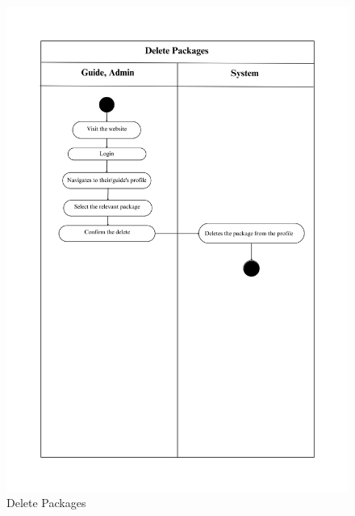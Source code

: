 \begin{figure}[h]
    \centering
    \includegraphics[width=1\textwidth]{Images/Activity Diagrams/16 Delete Packages.png}
    \caption{Delete Packages}
    \label{fig:activity-delete-packages}
\end{figure}

